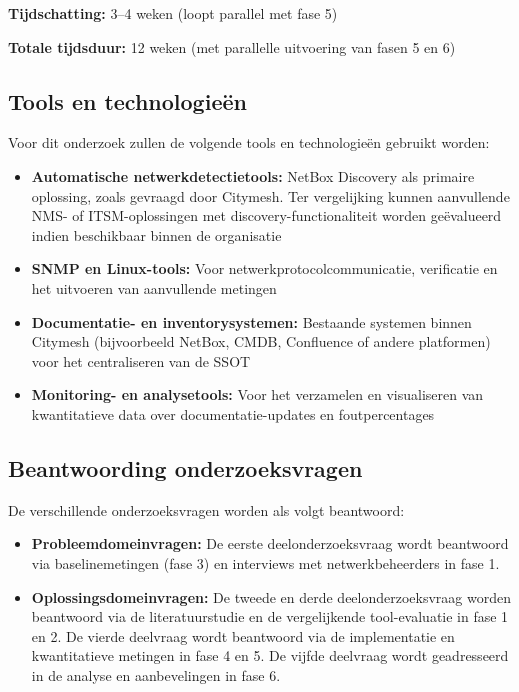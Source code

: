 \textbf{Tijdschatting:} 3--4 weken (loopt parallel met fase 5)

\textbf{Totale tijdsduur:} 12 weken (met parallelle uitvoering van fasen 5 en 6)

\subsection{Tools en technologieën}

Voor dit onderzoek zullen de volgende tools en technologieën gebruikt worden:
\begin{itemize}
  \item \textbf{Automatische netwerkdetectietools:} NetBox Discovery als primaire oplossing, zoals gevraagd door Citymesh. Ter vergelijking kunnen aanvullende NMS- of ITSM-oplossingen met discovery-functionaliteit worden geëvalueerd indien beschikbaar binnen de organisatie
  \item \textbf{SNMP en Linux-tools:} Voor netwerkprotocolcommunicatie, verificatie en het uitvoeren van aanvullende metingen
  \item \textbf{Documentatie- en inventorysystemen:} Bestaande systemen binnen Citymesh (bijvoorbeeld NetBox, CMDB, Confluence of andere platformen) voor het centraliseren van de SSOT
  \item \textbf{Monitoring- en analysetools:} Voor het verzamelen en visualiseren van kwantitatieve data over documentatie-updates en foutpercentages
\end{itemize}

\subsection{Beantwoording onderzoeksvragen}

De verschillende onderzoeksvragen worden als volgt beantwoord:
\begin{itemize}
  \item \textbf{Probleemdomeinvragen:} De eerste deelonderzoeksvraag wordt beantwoord via baselinemetingen (fase 3) en interviews met netwerkbeheerders in fase 1.
  \item \textbf{Oplossingsdomeinvragen:} De tweede en derde deelonderzoeksvraag worden beantwoord via de literatuurstudie en de vergelijkende tool-evaluatie in fase 1 en 2. De vierde deelvraag wordt beantwoord via de implementatie en kwantitatieve metingen in fase 4 en 5. De vijfde deelvraag wordt geadresseerd in de analyse en aanbevelingen in fase 6.
\end{itemize}

